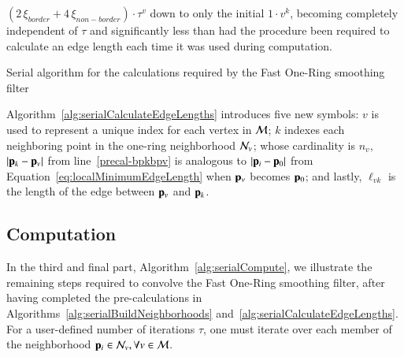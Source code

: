 ${(2\,\xi_{border} + 4\,\xi_{non-border})\cdot\tau^v}$ down to only the initial $1\cdot v^k$, becoming completely independent of $\tau$ and significantly less than had the procedure been required to calculate an edge length each time it was used during computation.%
%

%
%
\begin{algorithm}
	\DontPrintSemicolon


	\bigskip
	\FuncArgSty{($\bP$,\,$\bN$)}\;
\nl	{}
	\caption{Serial algorithm for the calculations required by the Fast One-Ring smoothing filter\label{alg:serialCalculateEdgeLengths}}
\end{algorithm}

Algorithm~\ref{alg:serialCalculateEdgeLengths} introduces five new symbols: $v$ is used to represent a unique index for each vertex in $\mathcal{M}$; $k$ indexes each neighboring point in the one-ring neighborhood $\mathcal{N}_v$; whose cardinality is $n_v$, $|\mathbf{p}_k-\mathbf{p}_v|$ from line~\ref{precal-bpkbpv} is analogous to $|\mathbf{p}_i-\mathbf{p}_0|$ from Equation~\ref{eq:localMinimumEdgeLength} when $\mathbf{p}_v$ becomes $\mathbf{p}_0$; and lastly, $\ell_{vk}$ is the length of the edge between $\mathbf{p}_v$ and $\mathbf{p}_k$.%
%
\subsection{Computation}
In the third and final part, Algorithm~\ref{alg:serialCompute}, we illustrate the remaining steps required to convolve the Fast One-Ring smoothing filter, after having completed the pre-calculations in Algorithms~\ref{alg:serialBuildNeighborhoods} and~\ref{alg:serialCalculateEdgeLengths}. For a user-defined number of iterations $\tau$, one must iterate over each member of the neighborhood $\mathbf{p}_i \in \mathcal{N}_v, \forall v \in \mathcal{M}$.


